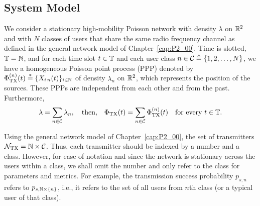 \subsection{System Model}

We consider a stationary high-mobility Poisson network with density $\lambda$ on $\R^2$ and with $N$ classes of users that share the same radio frequency channel as defined in the general network model of Chapter~\ref{cap:P2_00}.
%
Time is slotted, $\T=\N$, and for each time slot $t \in \T$ and each user class $n \in \cal{C} \triangleq \{1,2,\dots,N\}$, we have a homogeneous Poisson point process (PPP) denoted by $\Phi_\TX^{(n)}(t)\stackrel{*}{=} \{ X_{i\,n}(t) \}_{i\in\N}$ of density $\lambda_n$ on $\R^2$, which represents the position of the sources. These PPPs are independent from each other and from the past.
%
Furthermore,
\begin{align*}
    \lambda = \sum_{n\in\cal{C}} \lambda_n,
    \quad\text{then,}\quad
    \Phi_\TX(t) = \sum_{n\in\cal{C}} \Phi_\TX^{(n)}(t) \quad\text{for every $t\in\T$}.
\end{align*}

\begin{remark}
    Using the general network model of Chapter~\ref{cap:P2_00}, the set of transmitters $\cal{N}_\TX = \N\times\cal{C}$. Thus, each transmitter should be indexed by a number and a class. However, for ease of notation and since the network is stationary across the users within a class, we shall omit the number and only refer to the class for parameters and metrics.
    For example, the transmission success probability $p_{s,n}$ refers to $p_{s,\N\times\{n\}}$, i.e., it refers to the set of all users from $n$th class (or a typical user of that class).
\end{remark}

